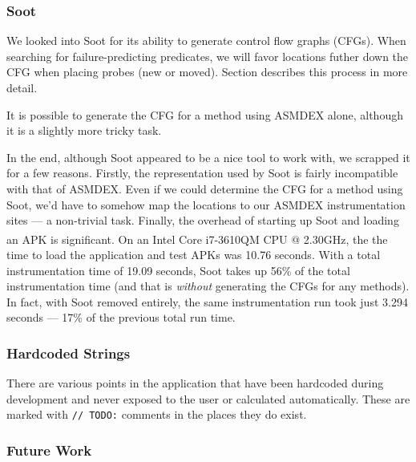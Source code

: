 \begin{figure}[h]
\caption{}
\label{fig:android_apk}
\end{figure}

\subsubsection{Soot}

We looked into Soot for its ability to generate control flow graphs (CFGs). When searching for failure-predicting predicates, we will favor locations futher down the CFG when placing probes (new or moved). Section  describes this process in more detail.

It is possible to generate the CFG for a method using ASMDEX alone, although it is a slightly more tricky task.

In the end, although Soot appeared to be a nice tool to work with, we scrapped it for a few reasons. Firstly, the representation used by Soot is fairly incompatible with that of ASMDEX. Even if we could determine the CFG for a method using Soot, we'd have to somehow map the locations to our ASMDEX instrumentation sites --- a non-trivial task. Finally, the overhead of starting up Soot and loading an APK is significant. On an Intel\textsuperscript{\textregistered} Core\textsuperscript{\texttrademark} i7-3610QM CPU @ 2.30GHz, the the time to load the application and test APKs was 10.76 seconds. With a total instrumentation time of 19.09 seconds, Soot takes up 56\% of the total instrumentation time (and that is \textit{without} generating the CFGs for any methods). In fact, with Soot removed entirely, the same instrumentation run took just 3.294 seconds --- 17\% of the previous total run time.

\subsubsection{Hardcoded Strings}

There are various points in the application that have been hardcoded during development and never exposed to the user or calculated automatically. These are marked with \texttt{// TODO:} comments in the places they do exist.

\subsubsection{Future Work}

